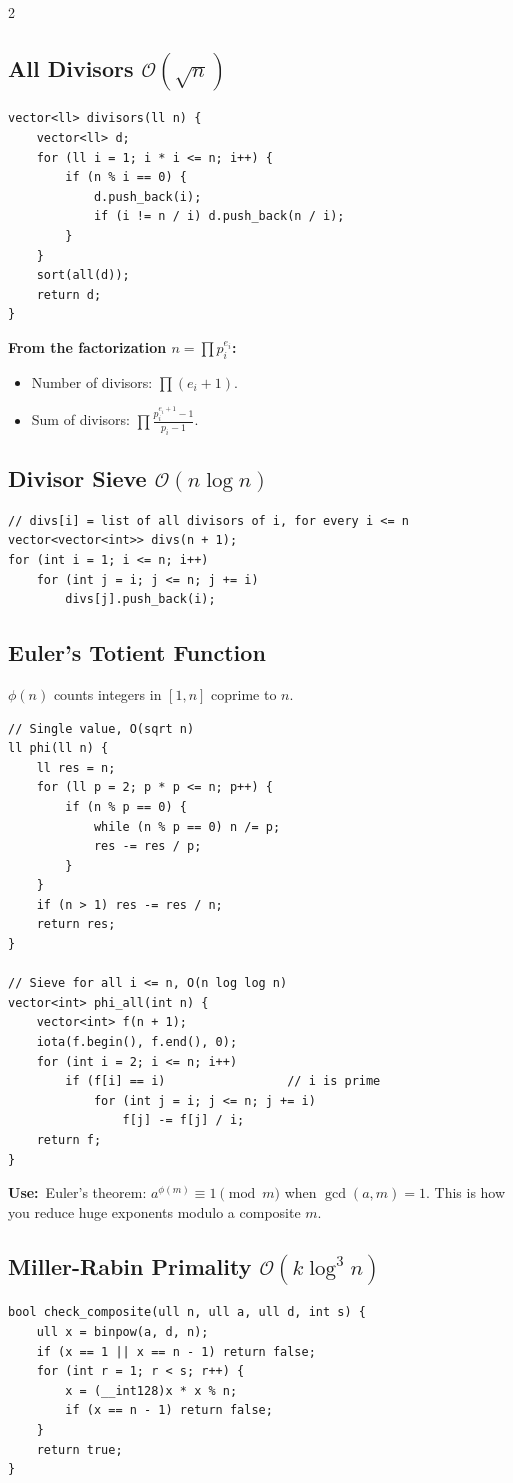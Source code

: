 \documentclass[10pt]{article}
\newcommand{\sub}[2]{\subsection[#1]{#1\hspace{0.6em}%
  \textnormal{\color{accent2}\small$\mathcal{O}(#2)$}}}
\newcommand{\uses}[1]{{\color{accent2}\footnotesize\textbf{Use:}}~{\footnotesize #1}\par}
\begin{document}
\begin{multicols}{2}
\sub{All Divisors}{\sqrt n}
\begin{lstlisting}
vector<ll> divisors(ll n) {
    vector<ll> d;
    for (ll i = 1; i * i <= n; i++) {
        if (n % i == 0) {
            d.push_back(i);
            if (i != n / i) d.push_back(n / i);
        }
    }
    sort(all(d));
    return d;
}
\end{lstlisting}
\textbf{From the factorization $n=\prod p_i^{e_i}$:}
\begin{itemize}
    \item Number of divisors: $\prod (e_i + 1)$.
    \item Sum of divisors: $\prod \frac{p_i^{e_i+1}-1}{p_i-1}$.
\end{itemize}

\sub{Divisor Sieve}{n \log n}
\begin{lstlisting}
// divs[i] = list of all divisors of i, for every i <= n
vector<vector<int>> divs(n + 1);
for (int i = 1; i <= n; i++)
    for (int j = i; j <= n; j += i)
        divs[j].push_back(i);
\end{lstlisting}

\subsection{Euler's Totient Function}
$\phi(n)$ counts integers in $[1,n]$ coprime to $n$.
\begin{lstlisting}
// Single value, O(sqrt n)
ll phi(ll n) {
    ll res = n;
    for (ll p = 2; p * p <= n; p++) {
        if (n % p == 0) {
            while (n % p == 0) n /= p;
            res -= res / p;
        }
    }
    if (n > 1) res -= res / n;
    return res;
}

// Sieve for all i <= n, O(n log log n)
vector<int> phi_all(int n) {
    vector<int> f(n + 1);
    iota(f.begin(), f.end(), 0);
    for (int i = 2; i <= n; i++)
        if (f[i] == i)                 // i is prime
            for (int j = i; j <= n; j += i)
                f[j] -= f[j] / i;
    return f;
}
\end{lstlisting}
\uses{Euler's theorem: $a^{\phi(m)} \equiv 1 \pmod m$ when
$\gcd(a,m)=1$. This is how you reduce huge exponents modulo a composite
$m$.}

\sub{Miller-Rabin Primality}{k \log^3 n}
\begin{lstlisting}
bool check_composite(ull n, ull a, ull d, int s) {
    ull x = binpow(a, d, n);
    if (x == 1 || x == n - 1) return false;
    for (int r = 1; r < s; r++) {
        x = (__int128)x * x % n;
        if (x == n - 1) return false;
    }
    return true;
}


\end{lstlisting}
\end{multicols}
\end{document}
